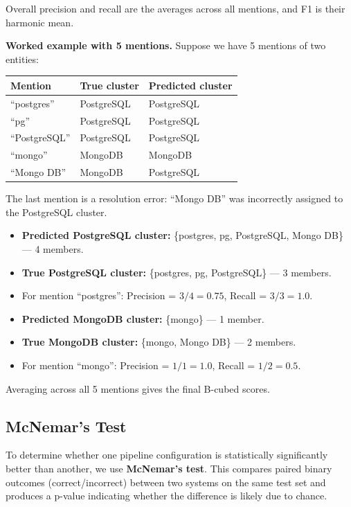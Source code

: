 Overall precision and recall are the averages across all mentions, and F1
is their harmonic mean.

\medskip\noindent\textbf{Worked example with 5 mentions.}
Suppose we have 5 mentions of two entities:

\begin{table}[ht]
\centering
\begin{tabular}{l l l}
\toprule
\textbf{Mention} & \textbf{True cluster} & \textbf{Predicted cluster} \\
\midrule
``postgres''     & PostgreSQL & PostgreSQL \\
``pg''           & PostgreSQL & PostgreSQL \\
``PostgreSQL''   & PostgreSQL & PostgreSQL \\
``mongo''        & MongoDB    & MongoDB \\
``Mongo DB''     & MongoDB    & PostgreSQL \\
\bottomrule
\end{tabular}
\end{table}

The last mention is a resolution error: ``Mongo DB'' was incorrectly
assigned to the PostgreSQL cluster.

\begin{itemize}
    \item \textbf{Predicted PostgreSQL cluster:} \{postgres, pg,
          PostgreSQL, Mongo DB\} --- 4 members.
    \item \textbf{True PostgreSQL cluster:} \{postgres, pg, PostgreSQL\}
          --- 3 members.
    \item For mention ``postgres'': Precision = $3/4 = 0.75$, Recall =
          $3/3 = 1.0$.
    \item \textbf{Predicted MongoDB cluster:} \{mongo\} --- 1 member.
    \item \textbf{True MongoDB cluster:} \{mongo, Mongo DB\} --- 2
          members.
    \item For mention ``mongo'': Precision = $1/1 = 1.0$, Recall =
          $1/2 = 0.5$.
\end{itemize}

Averaging across all 5 mentions gives the final B-cubed scores.

\subsection{McNemar's Test}

To determine whether one pipeline configuration is statistically
significantly better than another, we use \textbf{McNemar's test}.  This
compares paired binary outcomes (correct/incorrect) between two systems
on the same test set and produces a p-value indicating whether the
difference is likely due to chance.

